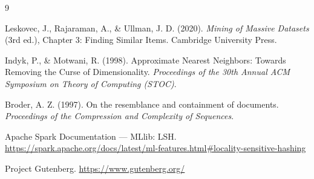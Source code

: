 \newpage
\begin{thebibliography}{9}

Leskovec, J., Rajaraman, A., \& Ullman, J. D. (2020). \textit{Mining of Massive Datasets} (3rd ed.), Chapter 3: Finding Similar Items. Cambridge University Press.

Indyk, P., \& Motwani, R. (1998). Approximate Nearest Neighbors: Towards Removing the Curse of Dimensionality. \textit{Proceedings of the 30th Annual ACM Symposium on Theory of Computing (STOC)}.

Broder, A. Z. (1997). On the resemblance and containment of documents. \textit{Proceedings of the Compression and Complexity of Sequences}.

Apache Spark Documentation --- MLlib: LSH. \url{https://spark.apache.org/docs/latest/ml-features.html#locality-sensitive-hashing}

Project Gutenberg. \url{https://www.gutenberg.org/}

\end{thebibliography}
